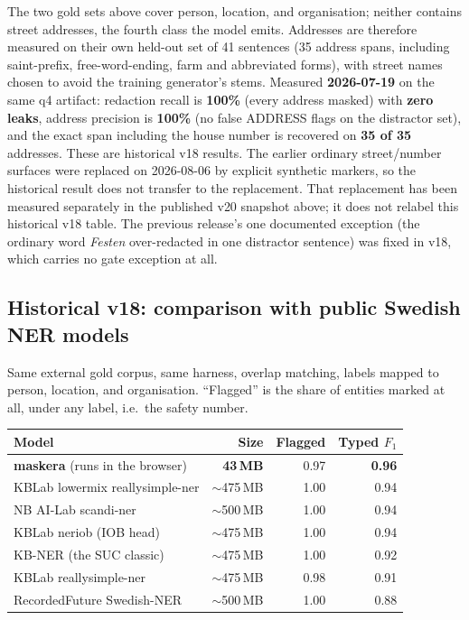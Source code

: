 \documentclass[10pt,a4paper]{article}
\begin{document}
The two gold sets above cover person, location, and organisation; neither
contains street addresses, the fourth class the model emits. Addresses are
therefore measured on their own held-out set of 41 sentences (35 address
spans, including saint-prefix, free-word-ending, farm and abbreviated
forms), with street names chosen to avoid the training generator's stems.
Measured \textbf{2026-07-19} on the same q4 artifact: redaction recall is
\textbf{100\%} (every address masked) with \textbf{zero leaks}, address
precision is \textbf{100\%} (no false ADDRESS flags on the distractor set),
and the exact span including the house number is recovered on \textbf{35 of
35} addresses. These are historical v18 results. The earlier ordinary
street/number surfaces were replaced on 2026-08-06 by explicit synthetic
markers, so the historical result does not transfer to the replacement. That
replacement has been measured separately in the published v20 snapshot above; it
does not relabel this historical v18 table. The previous release's
one documented exception (the ordinary word \emph{Festen}
over-redacted in one distractor sentence) was fixed in v18, which
carries no gate exception at all.

\subsection{Historical v18: comparison with public Swedish NER models}

Same external gold corpus, same harness, overlap matching, labels mapped
to person, location, and organisation. ``Flagged'' is the share of entities
marked at all, under any label, i.e.\ the safety number.

\begin{table}[H]
\centering
\begin{tabular}{lrrr}
\toprule
Model & Size & Flagged & Typed $F_1$ \\
\midrule
\textbf{maskera} (runs in the browser) & \textbf{43\,MB} & 0.97 & \textbf{0.96} \\
KBLab lowermix reallysimple-ner & $\sim$475\,MB & 1.00 & 0.94 \\
NB AI-Lab scandi-ner & $\sim$500\,MB & 1.00 & 0.94 \\
KBLab neriob (IOB head) & $\sim$475\,MB & 1.00 & 0.94 \\
KB-NER (the SUC classic) & $\sim$475\,MB & 1.00 & 0.92 \\
KBLab reallysimple-ner & $\sim$475\,MB & 0.98 & 0.91 \\
RecordedFuture Swedish-NER & $\sim$500\,MB & 1.00 & 0.88 \\
\bottomrule
\end{tabular}
\end{table}
\end{document}

